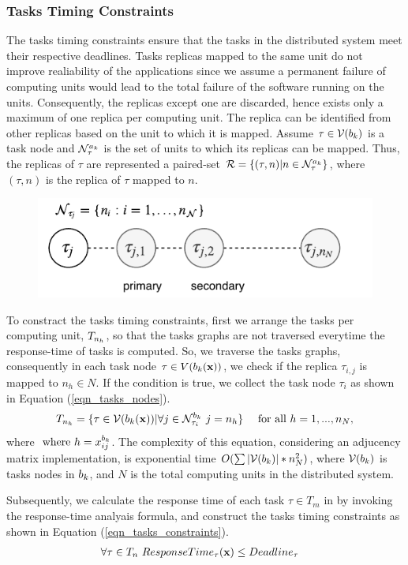 \subsubsection{Tasks Timing Constraints}
The tasks timing constraints ensure that the tasks in the distributed system meet their respective deadlines. Tasks replicas mapped to the same unit do not improve realiability of the applications since we assume a permanent failure of computing units would lead to the total failure of the software running on the units. Consequently, the replicas except one are discarded, hence exists only a maximum of one replica per computing unit. The replica can be identified from other replicas based on the unit to which it is mapped. Assume $\tau\in \mathcal{V}(b_{k})$ is a task node and $\sss{\mathcal{N}}[k][\tau]$ is the set of units to which its replicas can be mapped. Thus, the replicas of $\tau$ are represented a paired-set $\mathcal{R}=\{(\tau,n)|n\in\sss{\mathcal{N}}[k][\tau]\}$, where $(\tau,n)$ is the replica of $\tau$ mapped to $n$.
\begin{figure}[h!]
	\centering
	\includegraphics[width=0.6\linewidth]{img/task_replicas}
\end{figure}

To constract the tasks timing constraints, first we arrange the tasks per computing unit, $\ssb{T}[n_h]$, so that the tasks graphs are not traversed everytime the response-time of tasks is computed. So, we traverse the tasks graphs, consequently in each task node $\tau\in V(b_{k}(\textbf{x}))$, we check if the replica $\tau_{i,j}$ is mapped to $n_h\in N$. If the condition is true, we collect the task node $\tau_i$ as shown in Equation (\ref{eqn_tasks_nodes}). 
\begin{align}
\label{eqn_tasks_nodes}
T_{n_h}&=\{\tau\in \mathcal{V}(\at(\x)) | \forall j\in\sss{\mathcal{N}}[k][\tau_i][b]\ j=n_h\} & \mbox{ for all } h=1,...,n_N,
\end{align}
where $\mbox{ where }h=x^{b_k}_{ij}$. The complexity of this equation, considering an adjucency matrix implementation, is exponential time $O(\sum{|\mathcal{V}(b_{k})|*n_N^2})$, where $\mathcal{V}(b_{k})$ is tasks nodes in $b_{k}$, and $N$ is the total computing units in the distributed system. 

Subsequently, we calculate the response time of each task $\tau \in T_{m}$ in \ttx by invoking the response-time analyais formula, and construct the tasks timing constraints as shown in Equation (\ref{eqn_tasks_constraints}).
\begin{align}
\label{eqn_tasks_constraints}
\forall \tau\in T_{n} \ ResponseTime_\tau(\textbf{x})&\leq Deadline_\tau
\end{align}

